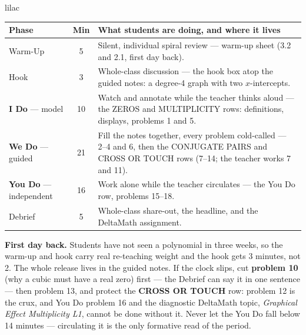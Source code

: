 \documentclass[10pt]{article}
\begin{document}
\boxguard[22]
\begin{skillbox}{lilac}
\small
\renewcommand{\arraystretch}{1.25}
\begin{tabularx}{\linewidth}{@{} l c X @{}}
\textbf{Phase} & \textbf{Min} & \textbf{What students are doing, and where it lives} \\
\midrule
Warm-Up                       & 5  & Silent, individual spiral review --- warm-up sheet (3.2 and 2.1, first day back). \\
Hook                          & 3  & Whole-class discussion --- the hook box atop the guided notes: a degree-4 graph with two $x$-intercepts. \\
\textbf{I Do} --- model       & 10 & Watch and annotate while the teacher thinks aloud --- the ZEROS and MULTIPLICITY rows: definitions, displays, problems 1 and 5. \\
\textbf{We Do} --- guided     & 21 & Fill the notes together, every problem cold-called --- 2--4 and 6, then the CONJUGATE PAIRS and CROSS OR TOUCH rows (7--14; the teacher works 7 and 11). \\
\textbf{You Do} --- independent & 16 & Work alone while the teacher circulates --- the You Do row, problems 15--18. \\
Debrief                       & 5  & Whole-class share-out, the headline, and the DeltaMath assignment. \\
\end{tabularx}

\smallskip
\textbf{First day back.} Students have not seen a polynomial in three weeks, so the warm-up
and hook carry real re-teaching weight and the hook gets 3 minutes, not 2. The whole release
lives in the guided notes. If the clock slips, cut \textbf{problem 10} (why a cubic must have a
real zero) first --- the Debrief can say it in one sentence --- then problem 13, and protect the
\textbf{CROSS OR TOUCH} row: problem 12 is the crux, and You Do problem 16 and the diagnostic
DeltaMath topic, \textit{Graphical Effect Multiplicity L1}, cannot be done without it. Never
let the You Do fall below 14 minutes --- circulating it is the only formative read of the
period.
\end{skillbox}
\end{document}
